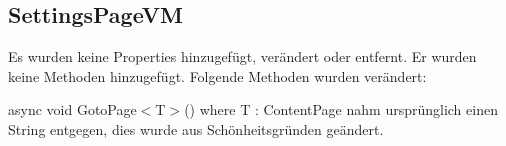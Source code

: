 \documentclass[../implementierung.tex]{subfiles}
\begin{document}
		\subsection{SettingsPageVM}
			Es wurden keine Properties hinzugefügt, verändert oder entfernt. \newline
			Er wurden keine Methoden hinzugefügt. \newline
			Folgende Methoden wurden verändert:
			\begin{itemize}
				\changed async void GotoPage$<$T$>$() where T : ContentPage nahm ursprünglich einen String entgegen, dies wurde aus Schönheitsgründen geändert.
			\end{itemize}
\end{document}
